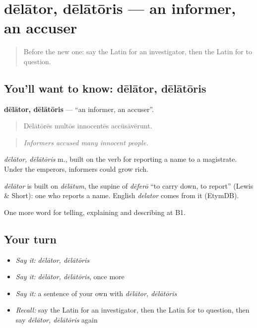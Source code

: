 \section[dēlātor, dēlātōris]{dēlātor, dēlātōris — an informer, an accuser}

\label{lesson:LA-C412-delator}



\begin{quote}
Before the new one: say the Latin for an investigator, then the Latin for to question.
\end{quote}

\subsection*{You'll want to know: dēlātor, dēlātōris}
\textbf{dēlātor, dēlātōris} — \textquotedblleft{}an informer, an accuser\textquotedblright{}.

\begin{quote}
Dēlātōrēs multōs innocentēs accūsāvērunt.
\end{quote}

\begin{quote}
\emph{Informers accused many innocent people.}
\end{quote}

\emph{dēlātor, dēlātōris} m., built on the verb for reporting a name to a magistrate. Under the emperors, informers could grow rich.

\begin{cousinweb}
\emph{dēlātor} is built on \emph{dēlātum}, the supine of \emph{dēferō} \textquotedblleft{}to carry down, to report\textquotedblright{} (Lewis \& Short): one who reports a name. English \emph{delator} comes from it (EtymDB).
\end{cousinweb}

\begin{grammarlens}[title={What you've built}]
One more word for telling, explaining and describing at B1.
\end{grammarlens}

\subsection*{Your turn}
\begin{itemize}
\raggedright
  \item \emph{Say it:} \emph{dēlātor, dēlātōris}
  \item \emph{Say it:} \emph{dēlātor, dēlātōris}, once more
  \item \emph{Say it:} a sentence of your own with \emph{dēlātor, dēlātōris}
  \item \emph{Recall:} say the Latin for an investigator, then the Latin for to question, then say \emph{dēlātor, dēlātōris} again
\end{itemize}

